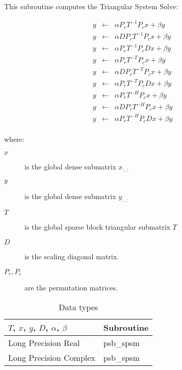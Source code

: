 %
%



This subroutine computes the Triangular System Solve:

\begin{eqnarray*}
y &\leftarrow& \alpha P_r T^{-1} P_c x + \beta y\\
y &\leftarrow& \alpha D P_r T^{-1} P_c x + \beta y\\
y &\leftarrow& \alpha P_r T^{-1} P_c D x + \beta y\\
y &\leftarrow& \alpha P_r T^{-T} P_c x + \beta y\\
y &\leftarrow& \alpha D P_r T^{-T} P_c x + \beta y\\
y &\leftarrow& \alpha P_r T^{-T} P_c D x + \beta y\\
y &\leftarrow& \alpha P_r T^{-H} P_c x + \beta y\\
y &\leftarrow& \alpha D P_r T^{-H} P_c x + \beta y\\
y &\leftarrow& \alpha P_r T^{-H} P_c D x + \beta y\\
\end{eqnarray*}


where:
\begin{description}
\item[$x$] is the global dense submatrix $x_{:, :}$
\item[$y$] is the global dense submatrix $y_{:, :}$
\item[$T$] is the global sparse block triangular submatrix $T$
\item[$D$] is the scaling diagonal matrix.
\item[$P_r, P_c$] are the permutation matrices.
\end{description}


\begin{table}[h]
\begin{center}
\begin{tabular}{ll}
\hline
$T$, $x$, $y$, $D$, $\alpha$, $\beta$ & {\bf Subroutine}\\
\hline
Long Precision Real & psb\_spsm \\
Long Precision Complex & psb\_spsm \\
\hline
\end{tabular}
\end{center}
\caption{Data types\label{tab:f90spsm}}
\end{table}




